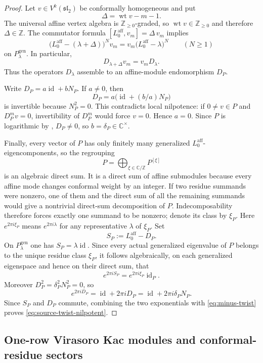 \documentclass[12pt,leqno]{amsart}
\numberwithin{equation}{section}
\newcommand{\id}{\operatorname{id}}
\newcommand{\wt}{\operatorname{wt}}
\def\Z{\mathbb{Z}}
\def\C{\mathbb{C}}
\begin{document}
\begin{proof}
Let $v\in V^k(\mathfrak{sl}_2)$ be conformally homogeneous and put
\[
 \Delta=\wt v-m-1.
\]
The universal affine vertex algebra is $\Z_{\ge0}$-graded, so
$\wt v\in\Z_{\ge0}$ and therefore $\Delta\in\Z$.  The commutator formula
$[L^{\mathrm{aff}}_0,v_m]=\Delta\,v_m$ implies
\[
 \bigl(L^{\mathrm{aff}}_0-(\lambda+\Delta)\bigr)^Nv_m
 =v_m\bigl(L^{\mathrm{aff}}_0-\lambda\bigr)^N
 \qquad(N\ge1)
\]
on $P^{\mathrm{gen}}_\lambda$.  In particular,
\[
 D_{\lambda+\Delta}v_m=v_mD_\lambda.
\]
Thus the operators $D_\lambda$ assemble to an affine-module endomorphism
$D_P$.

Write $D_P=a\id+bN_P$.  If $a\neq0$, then
\[
 D_P=a\bigl(\id+(b/a)N_P\bigr)
\]
is invertible because $N_P^2=0$.  This contradicts local nilpotence:
if $0\ne v\in P$ and $D_P^m v=0$, invertibility of $D_P^m$ would force
$v=0$.  Hence $a=0$.  Since $P$ is logarithmic by
\cite[Theorem~4.13]{McRaeYang}, $D_P\neq0$, so $b=\delta_P\in\C^\times$.

Finally, every vector of $P$ has only finitely many generalized
$L^{\mathrm{aff}}_0$-eigencomponents, so the regrouping
\[
 P=\bigoplus_{\xi\in\C/\Z}P^{[\xi]}
\]
is an algebraic direct sum.  It is a direct sum of affine submodules
because every affine mode changes
conformal weight by an integer.  If two residue summands were nonzero,
one of them and the direct sum of all the remaining summands would give a
nontrivial direct-sum decomposition of $P$.  Indecomposability therefore
forces exactly one summand to be nonzero; denote its class by $\xi_P$.
Here $e^{2\pi i\xi_P}$ means $e^{2\pi i\lambda}$ for any representative
$\lambda$ of $\xi_P$.  Set
\[
 S_P:=L^{\mathrm{aff}}_0-D_P.
\]
On $P^{\mathrm{gen}}_\lambda$ one has $S_P=\lambda\id$.  Since every
actual generalized eigenvalue of $P$ belongs to the unique residue class
$\xi_P$, it follows algebraically, on each generalized eigenspace and hence
on their direct sum, that
\[
 e^{2\pi iS_P}=e^{2\pi i\xi_P}\id_P.
\]
Moreover $D_P^2=\delta_P^2N_P^2=0$, so
\[
 e^{2\pi iD_P}=\id+2\pi iD_P
 =\id+2\pi i\delta_PN_P.
\]
Since $S_P$ and $D_P$ commute, combining the two exponentials with
\eqref{eq:minus-twist} proves \eqref{eq:source-twist-nilpotent}.
\end{proof}

\subsection{One-row Virasoro Kac modules and conformal-residue sectors}
\end{document}
